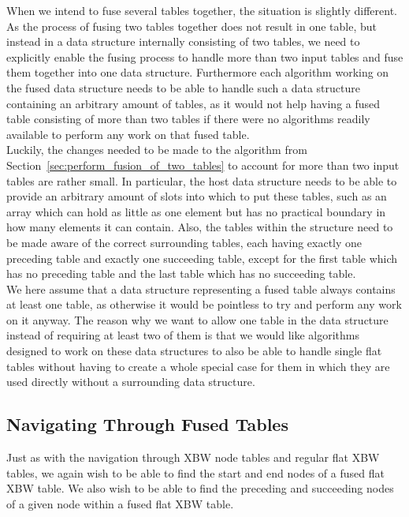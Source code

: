 \documentclass[a4paper,12pt,twoside,BCOR=10mm]{scrbook}
\begin{document}
When we intend to fuse several tables together, the situation is slightly different.
As the process of fusing two tables together does not result in one table,
but instead in a data structure internally consisting of two tables,
we need to explicitly enable the fusing process to handle more than two input tables
and fuse them together into one data structure.
Furthermore each algorithm working on the fused data structure needs to be able to
handle such a data structure containing an arbitrary amount of tables,
as it would not help having a fused table consisting of more than two tables if there
were no algorithms readily available to perform any work on that fused table. \\
Luckily, the changes needed to be made to the algorithm from Section~\ref{sec:perform_fusion_of_two_tables} to
account for more than two input tables are rather small.
In particular, the host data structure needs to be able to provide an arbitrary amount of slots into
which to put these tables, such as an array which can hold as little as one element but has no practical boundary
in how many elements it can contain. Also, the tables within the structure need to be made aware of the
correct surrounding tables, each having exactly one preceding table and exactly one succeeding table,
except for the first table which has no preceding table and the last table which has no succeeding table. \\
We here assume that a data structure representing a fused table always contains at least
one table, as otherwise it would be pointless to try and perform any work on it anyway.
The reason why we want to allow one table in the data structure instead of requiring at least two
of them is that we would like algorithms designed to work on these data structures to also be
able to handle single flat tables without having to create a whole special case for them in which
they are used directly without a surrounding data structure.

\subsection{Navigating Through Fused Tables}
\label{sec:fused_table_navigation}

Just as with the navigation through XBW node tables and regular flat XBW tables,
we again wish to be able to find the start and end nodes of a fused flat XBW table.
We also wish to be able to find the preceding and succeeding nodes of a
given node within a fused flat XBW table.
\end{document}
